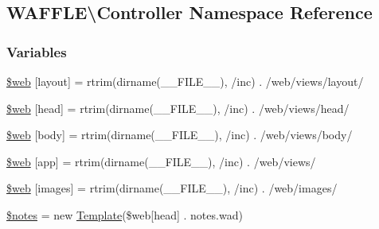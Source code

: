 \hypertarget{namespace_w_a_f_f_l_e_1_1_controller}{}\subsection{W\+A\+F\+F\+LE\textbackslash{}Controller Namespace Reference}
\label{namespace_w_a_f_f_l_e_1_1_controller}
\subsubsection*{Variables}
\begin{DoxyCompactItemize}
\item 
\hyperlink{namespace_w_a_f_f_l_e_1_1_controller_addf129be55acc267c327e86398d34ac5}{\$web} \mbox{[}\textquotesingle{}layout\textquotesingle{}\mbox{]} = rtrim(dirname(\+\_\+\+\_\+\+F\+I\+L\+E\+\_\+\+\_\+), \textquotesingle{}/inc\textquotesingle{}) . \textquotesingle{}/web/views/layout/\textquotesingle{}
\item 
\hyperlink{namespace_w_a_f_f_l_e_1_1_controller_a1d17c9f36b6261d10ed0564bc749f629}{\$web} \mbox{[}\textquotesingle{}head\textquotesingle{}\mbox{]} = rtrim(dirname(\+\_\+\+\_\+\+F\+I\+L\+E\+\_\+\+\_\+), \textquotesingle{}/inc\textquotesingle{}) . \textquotesingle{}/web/views/head/\textquotesingle{}
\item 
\hyperlink{namespace_w_a_f_f_l_e_1_1_controller_a119f09626762a89e6abf1852ee071671}{\$web} \mbox{[}\textquotesingle{}body\textquotesingle{}\mbox{]} = rtrim(dirname(\+\_\+\+\_\+\+F\+I\+L\+E\+\_\+\+\_\+), \textquotesingle{}/inc\textquotesingle{}) . \textquotesingle{}/web/views/body/\textquotesingle{}
\item 
\hyperlink{namespace_w_a_f_f_l_e_1_1_controller_ade212434c225bbfae525dc5ec32399c3}{\$web} \mbox{[}\textquotesingle{}app\textquotesingle{}\mbox{]} = rtrim(dirname(\+\_\+\+\_\+\+F\+I\+L\+E\+\_\+\+\_\+), \textquotesingle{}/inc\textquotesingle{}) . \textquotesingle{}/web/views/\textquotesingle{}
\item 
\hyperlink{namespace_w_a_f_f_l_e_1_1_controller_aa973df704de61f7d3bb7b360b1824901}{\$web} \mbox{[}\textquotesingle{}images\textquotesingle{}\mbox{]} = rtrim(dirname(\+\_\+\+\_\+\+F\+I\+L\+E\+\_\+\+\_\+), \textquotesingle{}/inc\textquotesingle{}) . \textquotesingle{}/web/images/\textquotesingle{}
\item 
\hyperlink{namespace_w_a_f_f_l_e_1_1_controller_a2bfacb2c81cae66264f765b0a20599c6}{\$notes} = new \hyperlink{class_w_a_f_f_l_e_1_1_framework_1_1_engines_1_1_template}{Template}(\$web\mbox{[}\textquotesingle{}head\textquotesingle{}\mbox{]} . \textquotesingle{}notes.\+wad\textquotesingle{})

\end{DoxyCompactItemize}

